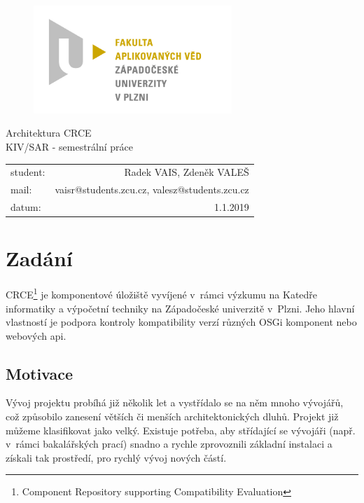 \documentclass[12pt, a4paper]{article}
\begin{document}
\begin{figure}[h!]
\centering
\includegraphics[bb= 0 0 820 445 , width=75mm]{favlogo.jpg}
\end{figure}

\vspace{5cm}

{\centering
{\huge Architektura CRCE}\\[1em]
{\large KIV/SAR - semestrální práce}\\[7,5cm]
}

\begin{tabular}{l r}
student: & Radek VAIS, Zdeněk VALEŠ\\
mail: & vaisr@students.zcu.cz, valesz@students.zcu.cz\\
datum: & 1.1.2019\\
\end{tabular}

\thispagestyle{empty}
\newpage

\section{Zadání} %

CRCE\footnote{Component Repository supporting Compatibility Evaluation} je komponentové úložiště vyvíjené v~rámci výzkumu na Katedře informatiky a výpočetní techniky na Západočeské univerzitě v~Plzni. Jeho hlavní vlastností je podpora kontroly kompatibility verzí různých OSGi komponent nebo webových api.

\subsection{Motivace}

Vývoj projektu probíhá již několik let a vystřídalo se na něm mnoho vývojářů, což způsobilo zanesení větších či menších architektonických dluhů. Projekt již můžeme klasifikovat jako velký. Existuje potřeba, aby střídající se vývojáři (např. v~rámci bakalářských prací) snadno a rychle zprovoznili základní instalaci a získali tak prostředí, pro rychlý vývoj nových částí. 
\end{document}
